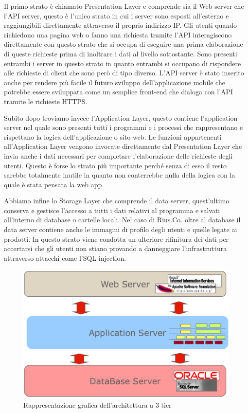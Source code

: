 Il primo strato è chiamato Presentation Layer e comprende sia il Web server che l'API server, questo è l'unico strato in cui i server sono esposti all'esterno e raggiungibili direttamente attraverso il proprio indirizzo IP. Gli utenti quando richiedono una pagina web o fanno una richiesta tramite l'API interagiscono direttamente con questo strato che si occupa di eseguire una prima elaborazione di queste richieste prima di inoltrare i dati al livello sottostante. Sono presenti entrambi i server in questo strato in quanto entrambi si occupano di rispondere alle richieste di client che sono però di tipo diverso. L'API server è stato inserito anche per rendere più facile il futuro sviluppo dell'applicazione mobile che potrebbe essere sviluppata come un semplice front-end che dialoga con l'API tramite le richieste HTTPS. 
\medskip

Subito dopo troviamo invece l'Application Layer, questo contiene l'application server nel quale sono presenti tutti i programmi e i processi che rappresentano e rispettano la logica dell'applicazione o sito web. Le funzioni appartenenti all'Application Layer vengono invocate direttamente dal Presentation Layer che invia anche i dati necessari per completare l'elaborazione delle richieste degli utenti. Questo è forse lo strato più importante perché senza di esso il resto sarebbe totalmente inutile in quanto non conterrebbe nulla della logica con la quale è stata pensata la web app. 
\medskip

Abbiamo infine lo Storage Layer che comprende il data server, quest'ultimo conserva e gestisce l'accesso a tutti i dati relativi al programma e salvati all'interno di database o cartelle locali. Nel caso di Rius.Co. oltre al database il data server contiene anche le immagini di profilo degli utenti e quelle legate ai prodotti. In questo strato viene condotta un ulteriore rifinitura dei dati per accertarsi che gli utenti non stiano provando a danneggiare l'infrastruttura attraverso attacchi come l'SQL injection. 

\begin{figure}[ht]
    \centering\includegraphics[scale=0.25]{images/3tier.png}
    \caption{Rappresentazione grafica dell'architettura a 3 tier}
\end{figure}

